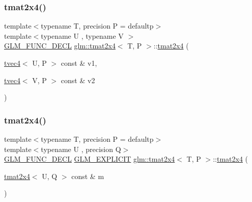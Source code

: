 \mbox{\label{structglm_1_1tmat2x4_ab52cdbf9a2f1ae4b9b8d3e6ef8e84039}} 
\subsubsection{\texorpdfstring{tmat2x4()}{tmat2x4()}\hspace{0.1cm}{\footnotesize\ttfamily [9/22]}}
{\footnotesize\ttfamily template$<$typename T, precision P = defaultp$>$ \\
template$<$typename U , typename V $>$ \\
\mbox{\hyperlink{setup_8hpp_ab2d052de21a70539923e9bcbf6e83a51}{G\+L\+M\+\_\+\+F\+U\+N\+C\+\_\+\+D\+E\+CL}} \mbox{\hyperlink{structglm_1_1tmat2x4}{glm\+::tmat2x4}}$<$ T, P $>$\+::\mbox{\hyperlink{structglm_1_1tmat2x4}{tmat2x4}} (\begin{DoxyParamCaption}\item[{\mbox{\hyperlink{structglm_1_1tvec4}{tvec4}}$<$ U, P $>$ const \&}]{v1,  }\item[{\mbox{\hyperlink{structglm_1_1tvec4}{tvec4}}$<$ V, P $>$ const \&}]{v2 }\end{DoxyParamCaption})}

\mbox{\label{structglm_1_1tmat2x4_a927ed33ecafc04dffbdc44b25e4b5466}} 
\subsubsection{\texorpdfstring{tmat2x4()}{tmat2x4()}\hspace{0.1cm}{\footnotesize\ttfamily [10/22]}}
{\footnotesize\ttfamily template$<$typename T, precision P = defaultp$>$ \\
template$<$typename U , precision Q$>$ \\
\mbox{\hyperlink{setup_8hpp_ab2d052de21a70539923e9bcbf6e83a51}{G\+L\+M\+\_\+\+F\+U\+N\+C\+\_\+\+D\+E\+CL}} \mbox{\hyperlink{setup_8hpp_a6c74f5a5e7b134ab69023ff9a30d4d5d}{G\+L\+M\+\_\+\+E\+X\+P\+L\+I\+C\+IT}} \mbox{\hyperlink{structglm_1_1tmat2x4}{glm\+::tmat2x4}}$<$ T, P $>$\+::\mbox{\hyperlink{structglm_1_1tmat2x4}{tmat2x4}} (\begin{DoxyParamCaption}\item[{\mbox{\hyperlink{structglm_1_1tmat2x4}{tmat2x4}}$<$ U, Q $>$ const \&}]{m }\end{DoxyParamCaption})}


